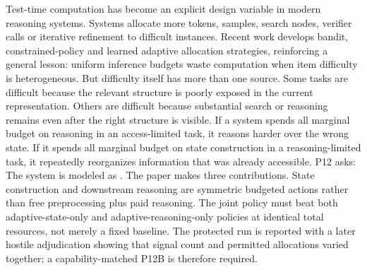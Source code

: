 \markdownRendererDocumentBegin
\markdownRendererSectionBegin
{}\markdownRendererInterblockSeparator
{}Test-time computation has become an explicit design variable in modern reasoning systems. Systems allocate more tokens, samples, search nodes, verifier calls or iterative refinement to difficult instances. Recent work develops bandit, constrained-policy and learned adaptive allocation strategies, reinforcing a general lesson: uniform inference budgets waste computation when item difficulty is heterogeneous.\markdownRendererInterblockSeparator
{}But difficulty itself has more than one source. Some tasks are difficult because the relevant structure is poorly exposed in the current representation. Others are difficult because substantial search or reasoning remains even after the right structure is visible. If a system spends all marginal budget on reasoning in an access-limited task, it reasons harder over the wrong state. If it spends all marginal budget on state construction in a reasoning-limited task, it repeatedly reorganizes information that was already accessible.\markdownRendererInterblockSeparator
{}P12 asks:\markdownRendererInterblockSeparator
{}\markdownRendererBlockQuoteBegin
{}
\markdownRendererBlockQuoteEnd \markdownRendererInterblockSeparator
{}The system is modeled as\markdownRendererInterblockSeparator
{}.\markdownRendererInterblockSeparator
{}The paper makes three contributions.\markdownRendererInterblockSeparator
{}\markdownRendererOlBeginTight
{} State construction and downstream reasoning are symmetric budgeted actions rather than free preprocessing plus paid reasoning.\markdownRendererOlItemEnd 
{} The joint policy must beat both adaptive-state-only and adaptive-reasoning-only policies at identical total resources, not merely a fixed baseline.\markdownRendererOlItemEnd 
{} The protected run is reported with a later hostile adjudication showing that signal count and permitted allocations varied together; a capability-matched P12B is therefore required.\markdownRendererOlItemEnd 

